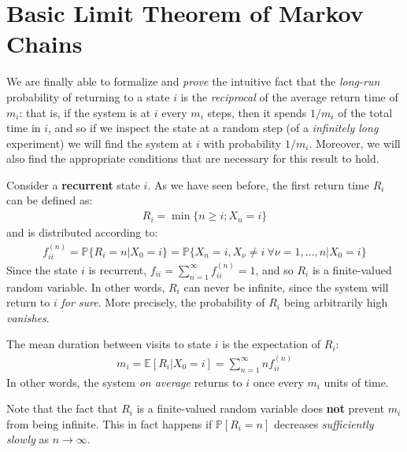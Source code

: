 \documentclass[../template.tex]{subfiles}
\begin{document}

\section{Basic Limit Theorem of Markov Chains}
We are finally able to formalize and \textit{prove} the intuitive fact that the \textit{long-run} probability of returning to a state $i$ is the \textit{reciprocal} of the average return time of $m_i$: that is, if the system is at $i$ every $m_i$ steps, then it spends $1/m_i$ of the total time in $i$, and so if we inspect the state at a random step (of a \textit{infinitely long} experiment) we will find the system at $i$ with probability $1/m_i$. Moreover, we will also find the appropriate conditions that are necessary for this result to hold.  

\medskip

Consider a \textbf{recurrent} state $i$. As we have seen before, the first return time $R_i$ can be defined as:
\begin{align*}
    R_i = \min\{n \geq i; X_n = i\}
\end{align*}
and is distributed according to:
\begin{align*}
    f_{ii}^{(n)} = \mathbb{P}\{R_i = n | X_0 = i\} = \mathbb{P}\{X_n = i, X_\nu \neq i \> \forall \nu = 1,\dots,n|X_0 = i\} 
\end{align*} 
Since the state $i$ is recurrent, $f_{ii} = \sum_{n=1}^\infty f_{ii}^{(n)} = 1$, and so $R_i$ is a finite-valued random variable. In other words, $R_i$ can never be infinite, since the system will return to $i$ \textit{for sure}. More precisely, the probability of $R_i$ being arbitrarily high \textit{vanishes}. 

\medskip

The mean duration between visits to state $i$ is the expectation of $R_i$:
\begin{align*}
    m_i = \mathbb{E}[R_i | X_0 = i] = \sum_{n=1}^\infty n f_{ii}^{(n)}
\end{align*}
In other words, the system \textit{on average} returns to $i$ once every $m_i$ units of time.  

\medskip

Note that the fact that $R_i$ is a finite-valued random variable does \textbf{not} prevent $m_i$ from being infinite. This in fact happens if $\mathbb{P}[R_i = n]$ decreases \textit{sufficiently slowly} as $n \to \infty$.   
\end{document}
